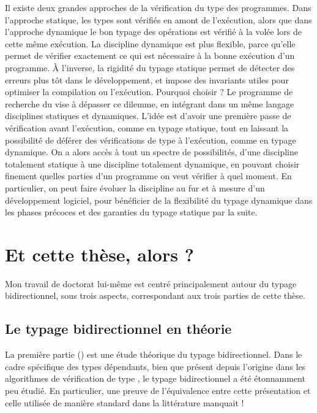 Il existe deux grandes approches de la vérification du type des programmes.
Dans l’approche statique,
les types sont vérifiés en amont de l’exécution, alors que dans l’approche dynamique le bon typage des opérations est vérifié à la volée lors de cette même exécution.
La discipline dynamique est plus flexible, parce qu’elle permet de vérifier exactement ce qui est nécessaire à la bonne exécution d’un programme.
À l’inverse, la rigidité du typage statique permet de détecter des erreurs plus tôt dans le développement, et impose des invariants utiles pour optimiser la compilation ou l’exécution.
Pourquoi choisir ? Le programme de recherche du   vise à dépasser ce dilemme, en intégrant dans un même langage disciplines statiques et dynamiques.
L’idée est d’avoir une première passe de vérification avant l’exécution, comme en typage statique, tout en laissant la possibilité de déférer des vérifications de type à l’exécution, comme en typage dynamique.
On a alors accès à tout un spectre de possibilités, d’une discipline totalement statique à une discipline totalement dynamique,
en pouvant choisir finement quelles parties d’un programme on veut vérifier à quel moment. En particulier, on peut faire évoluer la discipline au fur et à mesure d’un développement logiciel, pour bénéficier de la flexibilité du typage dynamique dans les phases précoces et des garanties du typage statique par la suite.

\section{Et cette thèse, alors ?}
\label{sec:cette-these}

Mon travail de doctorat lui-même
est centré principalement autour du typage bidirectionnel, sous
trois aspects, correspondant aux trois parties de cette thèse.

\subsection{Le typage bidirectionnel en théorie}

La première partie ()
est une étude théorique du typage bidirectionnel.
Dans le cadre spécifique des types dépendants, bien que présent depuis l’origine dans les algorithmes de vérification de type ,
le typage bidirectionnel a été étonnamment peu étudié. En particulier, une preuve
de l’équivalence entre cette présentation et celle utilisée de manière standard
dans la littérature manquait !

